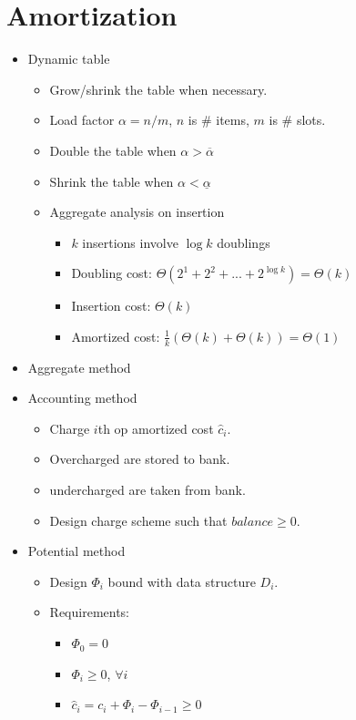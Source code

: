 \documentclass[twocolumn]{article}
\begin{document}
\section{Amortization}
\begin{itemize}
\item Dynamic table
  \begin{itemize}
  \item Grow/shrink the table when necessary.
  \item Load factor $\alpha = n / m$, $n$ is \# items, $m$ is \# slots.
  \item Double the table when $\alpha > \overline{\alpha}$
  \item Shrink the table when $\alpha < \underline{\alpha}$
  \item Aggregate analysis on insertion
    \begin{itemize}
    \item $k$ insertions involve $\log k$ doublings
    \item Doubling cost: $\Theta(2^1+2^2+...+2^{\log k}) = \Theta(k)$
    \item Insertion cost: $\Theta(k)$
    \item Amortized cost: $\frac{1}{k}(\Theta(k)+\Theta(k)) = \Theta(1)$
    \end{itemize}
  \end{itemize}
\item Aggregate method
\item Accounting method
  \begin{itemize}
  \item Charge $i$th op amortized cost $\hat{c}_i$.
  \item Overcharged are stored to bank.
  \item undercharged are taken from bank.
  \item Design charge scheme such that $balance \ge 0$.
  \end{itemize}
\item Potential method
  \begin{itemize}
  \item Design $\Phi_i$ bound with data structure $D_i$.
  \item Requirements: 
    \begin{itemize}
    \item $\Phi_0 = 0$
    \item $\Phi_i \ge 0$, $\forall i$
    \item $\hat{c}_i = c_i + \Phi_i - \Phi_{i-1} \ge 0$
    \end{itemize}

\end{itemize}
\end{itemize}
\end{document}

